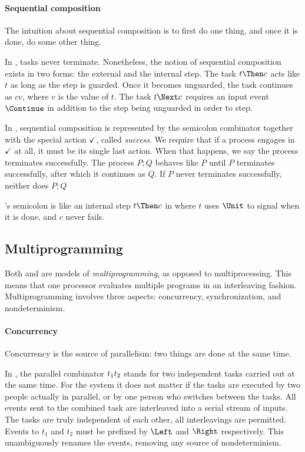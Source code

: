 \paragraph{Sequential composition}

The intuition about sequential composition is to first do one thing, and once it is done, do some other thing.

In \TOP, tasks never terminate.
Nonetheless, the notion of sequential composition exists in two forms: the external and the internal step.
The task $t \Then c$ acts like $t$ as long as the step is guarded.
Once it becomes unguarded, the task continues as $cv$, where $v$ is the value of $t$.
The task $t \Next c$ requires an input event $\Continue$ in addition to the step being unguarded in order to step.

In \CSP, sequential composition is represented by the semicolon combinator together with the special action $\checkmark$, called \emph{success}.
We require that if a process engages in $\checkmark$ at all, it must be its single last action.
When that happens, we say the process terminates successfully.
The process $P;Q$ behaves like $P$ until $P$ terminates successfully, after which it continues as $Q$.
If $P$ never terminates successfully, neither does $P;Q$

\CSP's semicolon is like an internal step $t \Then c$ in \TOP where $t$ uses $\Unit$ to signal when it is done, and $c$ never fails.


\subsection{Multiprogramming}

Both \TOP and \CSP are models of \emph{multiprogramming}, as opposed to multiprocessing.
This means that one processor evaluates multiple programs in an interleaving fashion.
Multiprogramming involves three aspects: concurrency, synchronization, and nondeterminism.

\paragraph{Concurrency}

Concurrency is the source of parallelism: two things are done at the same time.

In \TOP, the parallel combinator $t_1 \relax t_2$ stands for two independent tasks carried out at the same time.
For the system it does not matter if the tasks are executed by two people actually in parallel, or by one person who switches between the tasks.
All events sent to the combined task are interleaved into a serial stream of inputs.
The tasks are truly independent of each other, all interleavings are permitted.
Events to $t_1$ and $t_2$ must be prefixed by $\Left$ and $\Right$ respectively.
This unambiguously renames the events, removing any source of nondeterminism.

